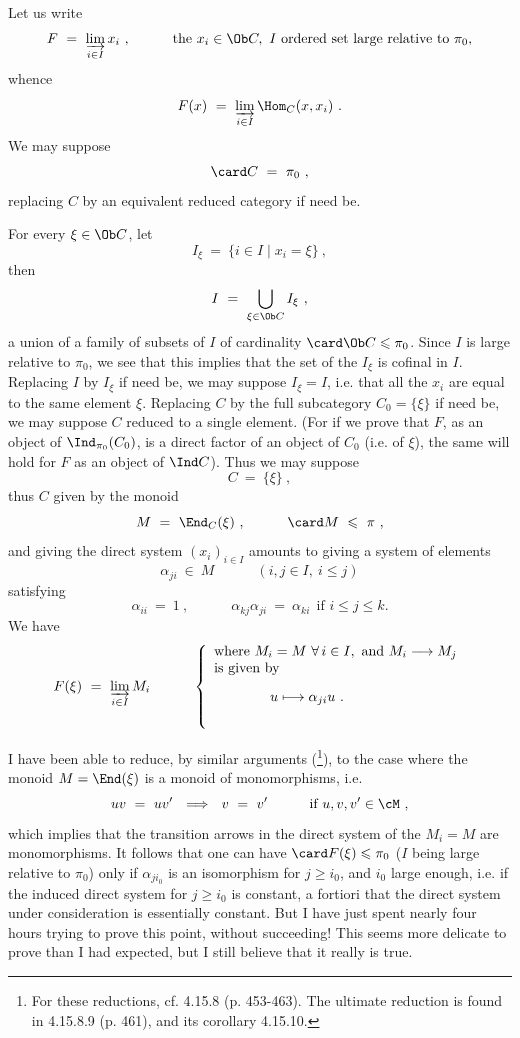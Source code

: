 Let us write
\[
F \ = \ \varinjlim_{i\in I} x_i\ , \qquad\quad \text{the } x_i \in \Ob C,\ I \text{ ordered set large relative to } \pi_0,
\]
whence
\[
F(x) \ = \ \varinjlim_{i\in I} \Hom_C(x, x_i)\ .
\]
We may suppose
\[
\card C \ = \ \pi_0\ ,
\]
replacing $C$ by an equivalent reduced category if need be.

For every $\xi \in \Ob C$, let
\[
I_{\xi} \ = \ \{ i \in I \mid x_i = \xi \}\ ,
\]
then
\[
I \ = \ \bigcup_{\xi\in\Ob C} I_{\xi}\ ,
\]
a union of a family of subsets of $I$ of cardinality $\card\Ob C \leqslant \pi_0$. Since $I$ is large relative to $\pi_0$, we see that this implies that the set of the $I_{\xi}$ is cofinal in $I$. Replacing $I$ by $I_{\xi}$ if need be, we may suppose $I_{\xi} = I$, i.e. that all the $x_i$ are equal to the same element $\xi$. Replacing $C$ by the full subcategory $C_0 = \{\xi\}$ if need be, we may suppose $C$ reduced to a single element. (For if we prove that $F$, as an object of $\Ind_{\pi_0}(C_0)$, is a direct factor of an object of $C_0$ (i.e. of $\xi$), the same will hold for $F$ as an object of $\Ind C$). Thus we may suppose
\[
C \ = \ \{\xi\}\ ,
\]
thus $C$ given by the monoid
\[
M \ = \ \End_C(\xi)\ , \qquad\quad \card M \ \leqslant\ \pi\ ,
\]
and giving the direct system $(x_i)_{i\in I}$ amounts to giving a system of elements
\[
\alpha_{ji} \ \in\ M \qquad\quad (i, j \in I,\ i \leqslant j)
\]
satisfying
\[
\alpha_{ii} \ = \ 1\ , \qquad\quad \alpha_{kj}\alpha_{ji} \ = \ \alpha_{ki} \ \ \text{if } i \leqslant j \leqslant k.
\]
We have
\[
F(\xi) \ = \ \varinjlim_{i\in I} M_i \qquad\quad
\left\{
\begin{array}{l}
\text{where } M_i = M \ \forall\, i \in I, \text{ and } M_i \longrightarrow M_j \\
\text{is given by} \\[2ex]
\qquad\qquad u \longmapsto \alpha_{ji}u\ . \\[4ex]
\end{array}
\right.
\]


I have been able to reduce, by similar arguments (\footnote[92]{For these reductions, cf. 4.15.8 (p. 453-463). The ultimate reduction is found in 4.15.8.9 (p. 461), and its corollary 4.15.10.}), to the case where the monoid $M = \End(\xi)$ is a monoid of monomorphisms, i.e.
\[
uv \ = \ uv' \ \ \Longrightarrow\ \ v \ = \ v' \qquad\quad \text{if } u, v, v' \in \cM\ ,
\] %
which implies that the transition arrows in the direct system of the $M_i = M$ are monomorphisms. It follows that one can have $\card F(\xi) \leqslant \pi_0$ ($I$ being large relative to $\pi_0$) only if $\alpha_{ji_0}$ is an isomorphism for $j \geqslant i_0$, and $i_0$ large enough, i.e. if the induced direct system for $j \geqslant i_0$ is constant, a fortiori that the direct system under consideration is essentially constant. But I have just spent nearly four hours trying to prove this point, without succeeding! This seems more delicate to prove than I had expected, but I still believe that it really is true.

